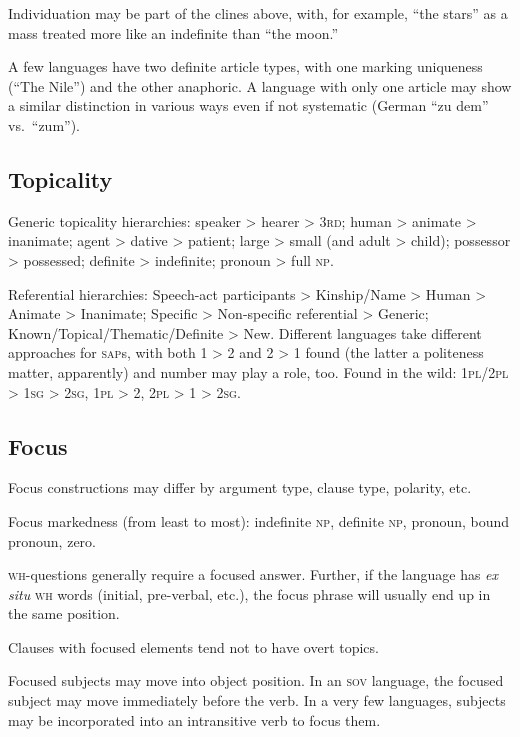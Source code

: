\documentclass[11pt]{article}
\newcommand{\I}[1]{\textsc{#1}}   %
\begin{document}
{Individuation may be part of the clines above, with, for example,
``the stars'' as a mass treated more like an indefinite than ``the
moon.'' 

A few languages have two definite article types, with one marking
uniqueness (``The Nile'') and the other anaphoric.  A language with
only one article may show a similar distinction in various ways even
if not systematic (German ``zu dem'' vs.\ ``zum'').


\subsection{Topicality}
Generic topicality hierarchies: speaker > hearer > \I{3rd}; human >
animate > inanimate; agent > dative > patient; large > small (and
adult > child); possessor > possessed; definite > indefinite; pronoun
> full \I{np}.

Referential hierarchies: Speech-act participants > Kinship/Name >
Human > Animate > Inanimate; Specific > Non-specific referential >
Generic; Known/Topical/Thematic/Definite > New.  Different languages
take different approaches for \I{sap}s, with both 1 > 2 and 2 > 1
found (the latter a politeness matter, apparently) and number may play
a role, too. Found in the wild: \I{1pl/2pl > 1sg > 2sg}, \I{1pl > 2},
\I{2pl > 1 > 2sg}.

\subsection{Focus}
Focus constructions may differ by argument type, clause type,
polarity, etc.

Focus markedness (from least to most): indefinite \I{np}, definite
\I{np}, pronoun, bound pronoun, zero.

\I{wh}-questions generally require a focused answer.  Further, if the
language has \textit{ex situ} \I{wh} words (initial, pre-verbal, etc.),
the focus phrase will usually end up in the same position.

Clauses with focused elements tend not to have overt topics.

Focused subjects may move into object position. In an \I{sov}
language, the focused subject may move immediately before the verb.
In a very few languages, subjects may be incorporated into an
intransitive verb to focus them.

}
\end{document}
